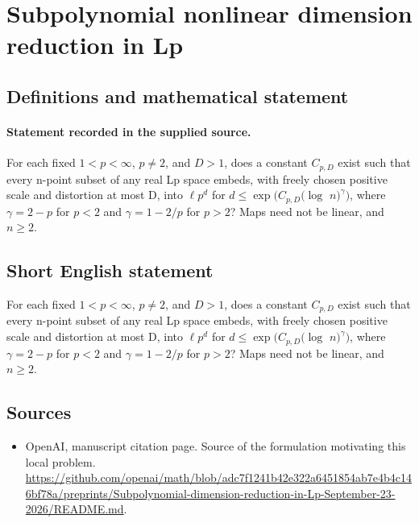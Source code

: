 \documentclass[11pt]{article}
\begin{document}
\section*{Subpolynomial nonlinear dimension reduction in Lp}\label{30007122}
\subsection{Definitions and mathematical statement}
\paragraph{Statement recorded in the supplied source.}
For each fixed $1<p<\infty $, $p\neq 2$, and $D>1$, does a constant $C_{p,D}$ exist such that every n-point subset of any real Lp space embeds, with freely chosen positive scale and distortion at most D, into $\ell p^d$ for $d\leq \exp (C_{p,D}(\log $ $n)^\gamma )$, where $\gamma =2-p$ for $p<2$ and $\gamma =1-2/p$ for $p>2$? Maps need not be linear, and $n\geq 2$.
\subsection{Short English statement}
For each fixed $1<p<\infty $, $p\neq 2$, and $D>1$, does a constant $C_{p,D}$ exist such that every n-point subset of any real Lp space embeds, with freely chosen positive scale and distortion at most D, into $\ell p^d$ for $d\leq \exp (C_{p,D}(\log $ $n)^\gamma )$, where $\gamma =2-p$ for $p<2$ and $\gamma =1-2/p$ for $p>2$? Maps need not be linear, and $n\geq 2$.
\subsection{Sources}
\begin{itemize}
\item[S1] OpenAI, manuscript citation page. Source of the formulation motivating this local problem.
\url{https://github.com/openai/math/blob/adc7f1241b42e322a6451854ab7e4b4c146bf78a/preprints/Subpolynomial-dimension-reduction-in-Lp-September-23-2026/README.md}.
\end{itemize}
\end{document}

